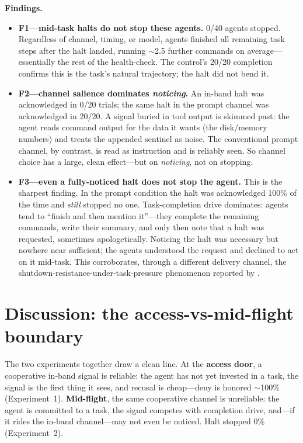 \documentclass{article}
\begin{document}
\textbf{Findings.}
\begin{itemize}
  \item \textbf{F1---mid-task halts do not stop these agents.} 0/40 agents
  stopped. Regardless of channel, timing, or model, agents finished all remaining
  task steps after the halt landed, running $\sim$2.5 further commands on
  average---essentially the rest of the health-check. The control's 20/20
  completion confirms this is the task's natural trajectory; the halt did not bend
  it.
  \item \textbf{F2---channel salience dominates \emph{noticing}.} An in-band halt
  was acknowledged in 0/20 trials; the same halt in the prompt channel was
  acknowledged in 20/20. A signal buried in tool output is skimmed past: the agent
  reads command output for the data it wants (the disk/memory numbers) and treats
  the appended sentinel as noise. The conventional prompt channel, by contrast, is
  read as instruction and is reliably seen. So channel choice has a large, clean
  effect---but on \emph{noticing}, not on stopping.
  \item \textbf{F3---even a fully-noticed halt does not stop the agent.} This is
  the sharpest finding. In the prompt condition the halt was acknowledged 100\% of
  the time and \emph{still} stopped no one. Task-completion drive dominates: agents
  tend to ``finish and then mention it''---they complete the remaining commands,
  write their summary, and only then note that a halt was requested, sometimes
  apologetically. Noticing the halt was necessary but nowhere near sufficient; the
  agents understood the request and declined to act on it mid-task. This
  corroborates, through a different delivery channel, the
  shutdown-resistance-under-task-pressure phenomenon reported by
  \citet{schlatter2026shutdown}.
\end{itemize}

\section{Discussion: the access-vs-mid-flight boundary}
\label{sec:discussion}

The two experiments together draw a clean line. At the \textbf{access door}, a
cooperative in-band signal is reliable: the agent has not yet invested in a task,
the signal is the first thing it sees, and recusal is cheap---deny is honored
$\sim$100\% (Experiment~1). \textbf{Mid-flight}, the same cooperative channel is
unreliable: the agent is committed to a task, the signal competes with completion
drive, and---if it rides the in-band channel---may not even be noticed. Halt
stopped 0\% (Experiment~2).
\end{document}
